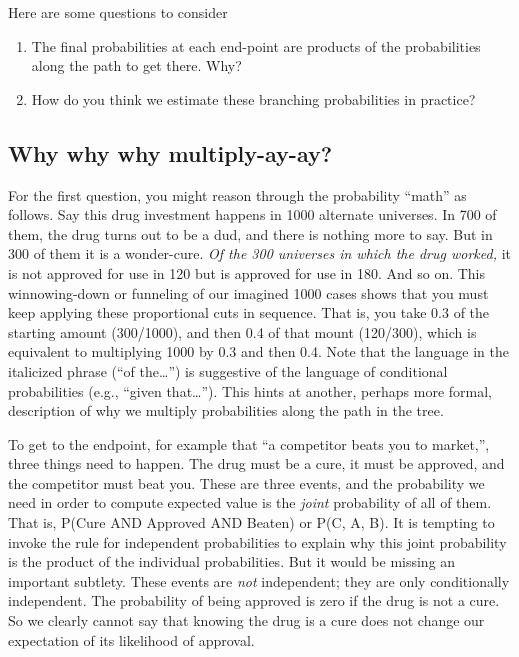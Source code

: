 \documentclass[openany]{book}
\providecommand{\tightlist}{%
  \setlength{\itemsep}{0pt}\setlength{\parskip}{0pt}}
\begin{document}
Here are some questions to consider

\begin{enumerate}
\def\labelenumi{\arabic{enumi}.}
\tightlist
\item
  The final probabilities at each end-point are products of the probabilities along the path to get there. Why?
\item
  How do you think we estimate these branching probabilities in practice?
\end{enumerate}

\hypertarget{why-why-why-multiply-ay-ay}{%
\subsection*{Why why why multiply-ay-ay?}\label{why-why-why-multiply-ay-ay}}

For the first question, you might reason through the probability ``math'' as follows. Say this drug investment happens in 1000 alternate universes. In 700 of them, the drug turns out to be a dud, and there is nothing more to say. But in 300 of them it is a wonder-cure. \emph{Of the 300 universes in which the drug worked,} it is not approved for use in 120 but is approved for use in 180. And so on. This winnowing-down or funneling of our imagined 1000 cases shows that you must keep applying these proportional cuts in sequence. That is, you take 0.3 of the starting amount (300/1000), and then 0.4 of that mount (120/300), which is equivalent to multiplying 1000 by 0.3 and then 0.4. Note that the language in the italicized phrase (``of the\ldots{}'') is suggestive of the language of conditional probabilities (e.g., ``given that\ldots{}''). This hints at another, perhaps more formal, description of why we multiply probabilities along the path in the tree.

To get to the endpoint, for example that ``a competitor beats you to market,'', three things need to happen. The drug must be a cure, it must be approved, and the competitor must beat you. These are three events, and the probability we need in order to compute expected value is the \emph{joint} probability of all of them. That is, P(Cure AND Approved AND Beaten) or P(C, A, B). It is tempting to invoke the rule for independent probabilities to explain why this joint probability is the product of the individual probabilities. But it would be missing an important subtlety. These events are \emph{not} independent; they are only conditionally independent. The probability of being approved is zero if the drug is not a cure. So we clearly cannot say that knowing the drug is a cure does not change our expectation of its likelihood of approval.
\end{document}
